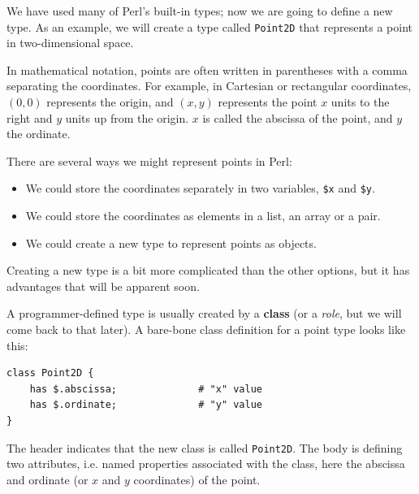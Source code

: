 We have used many of Perl's built-in types; now we are going
to define a new type.  As an example, we will create a type
called {\tt Point2D} that represents a point in 
two-dimensional space.

In mathematical notation, points are often written in
parentheses with a comma separating the coordinates. For example,
in Cartesian or rectangular coordinates, $(0,0)$ represents 
the origin, and $(x,y)$ represents the point $x$ units to the 
right and $y$ units up from the origin. $x$ is called 
the abscissa of the point, and $y$ the ordinate.

There are several ways we might represent points in Perl:

\begin{itemize}

\item We could store the coordinates separately in two
variables, {\tt \$x} and {\tt \$y}.

\item We could store the coordinates as elements in a list, 
an array or a pair.

\item We could create a new type to represent points as
objects.

\end{itemize}

Creating a new type is a bit more complicated than the 
other options, but it has advantages that will be apparent soon.

A programmer-defined type is usually created by a {\bf class}
(or a \emph{role}, but we will come back to that later). 
A bare-bone class definition for a point type looks like this:

\begin{verbatim}
class Point2D {
    has $.abscissa;              # "x" value
    has $.ordinate;              # "y" value
}
\end{verbatim}
%
The header indicates that the new class is called {\tt Point2D}.
The body is defining two attributes, i.e. named properties 
associated with the class, here the abscissa and ordinate 
(or $x$ and $y$ coordinates) of the point.

